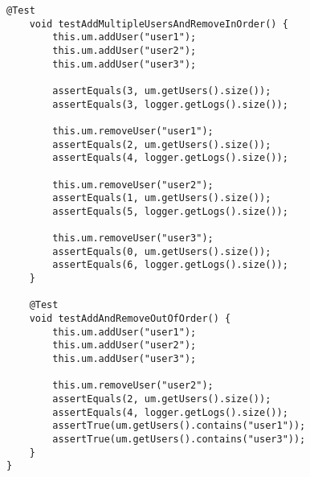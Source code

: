 \begin{lstlisting}[style=javastyle, caption={UserManagerWithAuditTest}]
    @Test
    void testAddMultipleUsersAndRemoveInOrder() {
        this.um.addUser("user1");
        this.um.addUser("user2");
        this.um.addUser("user3");

        assertEquals(3, um.getUsers().size());
        assertEquals(3, logger.getLogs().size());

        this.um.removeUser("user1");
        assertEquals(2, um.getUsers().size());
        assertEquals(4, logger.getLogs().size());

        this.um.removeUser("user2");
        assertEquals(1, um.getUsers().size());
        assertEquals(5, logger.getLogs().size());

        this.um.removeUser("user3");
        assertEquals(0, um.getUsers().size());
        assertEquals(6, logger.getLogs().size());
    }

    @Test
    void testAddAndRemoveOutOfOrder() {
        this.um.addUser("user1");
        this.um.addUser("user2");
        this.um.addUser("user3");

        this.um.removeUser("user2");
        assertEquals(2, um.getUsers().size());
        assertEquals(4, logger.getLogs().size());
        assertTrue(um.getUsers().contains("user1"));
        assertTrue(um.getUsers().contains("user3"));
    }
}

\end{lstlisting}